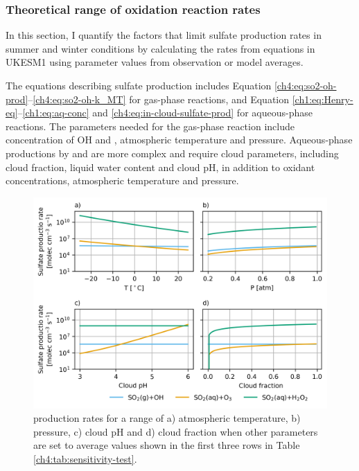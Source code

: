 \subsubsection{Theoretical range of  oxidation reaction rates}

In this section, I quantify the factors that limit sulfate production rates in summer and winter conditions by calculating the rates from equations in UKESM1 using parameter values from observation or model averages. 

The equations describing sulfate production includes Equation \ref{ch4:eq:so2-oh-prod}--\ref{ch4:eq:so2-oh-k_MT} for gas-phase reactions, and Equation \ref{ch1:eq:Henry-eq}--\ref{ch1:eq:aq-conc} and \ref{ch4:eq:in-cloud-sulfate-prod} for aqueous-phase reactions. The parameters needed for the gas-phase reaction include concentration of OH and , atmospheric temperature and pressure. Aqueous-phase productions by  and  are more complex and require cloud parameters, including cloud fraction, liquid water content and cloud pH, in addition to oxidant concentrations, atmospheric temperature and pressure. 


\begin{figure}
    \centering
    \includegraphics{Chapter4/Figs/oxidation_sensitivity.png}
    \caption[ oxidation range]{ production rates for a range of a) atmospheric temperature, b) pressure, c) cloud pH and d) cloud fraction when other parameters are set to average values shown in the first three rows in Table \ref{ch4:tab:sensitivity-test}.}
    \label{fig:ch4:oxidation-sensitivity}
\end{figure}

